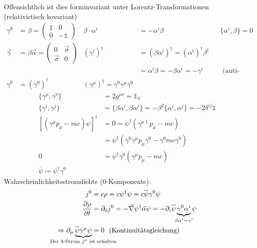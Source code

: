 Offensichtlich ist dies forminvariant unter Lorentz-Transformationen (relativistisch kovariant)
	\begin{align*}
		\gamma^0 &= \beta =
		\begin{pmatrix}
			\mathds{1} & 0 \\
			0 & -\mathds{1}
		\end{pmatrix}
		& \beta \cdot \alpha^i &= -\alpha^i \beta &
		&\{\alpha^i, \beta \} = 0 \\
		\vec{\gamma} &= \beta \vec{\alpha} =
		\begin{pmatrix}
			0 & \vec{\sigma} \\
			\vec{\sigma} & 0
		\end{pmatrix} &
		(\gamma^i)^\dagger &= (\beta \alpha^i)^\dagger
		= (\alpha^i)^\dagger \beta^\dagger \\
		& & &= \alpha^i \beta = -\beta \alpha^i = -\gamma^i
		& &\text{ (anti-hermitesch)} \\
		\gamma^0 &= (\gamma^0)^\dagger 
		& \boxed{(\gamma^\mu)^\dagger = \gamma^0 \gamma^\mu \gamma^0}&
	\end{align*}
	\begin{align*}
		\{\gamma^\mu, \gamma^\nu\} &= 2 g^{\mu \nu} = \mathds{1}_4\\
		\{\gamma^i, \gamma^j\} &=
		\{\beta \alpha^i, \beta \alpha^j\}
		= - \beta^2 \{\alpha^i, \alpha^j\} = -2 \delta^{ij} \mathds{1}\\
		\left[
			(\gamma^\mu p_\mu - m c) \psi
		\right]^\dagger &= 0 
		= \psi^\dagger (\gamma^{\mu \dagger} p_\mu - mc) \\
		&= \psi^\dagger \left(
			\gamma^0 \gamma^\mu p_\mu \gamma^0 - \gamma^0 mc \gamma^0
		\right) \\
		0 &= \psi^\dagger \gamma^0 (\gamma^\mu p_\mu - mc) \\
		\overline{\psi} \coloneqq \psi^\dagger \gamma^0
	\end{align*}
Wahrscheinlichkeitsstromdichte (0-Komponente):
	\begin{align*}
		j^0 &= c \rho = c \psi^\dagger \psi = c \overline{\psi} \gamma^0 \psi \\
		\frac{\partial \rho}{\partial t}
		&= \partial_0 j^0 = -\vec{\nabla} \psi^\dagger \vec{\alpha} \psi 
		= - \partial_i \overline{\psi}
		\underbrace{\gamma^0 \alpha^i}_{\mathclap{\beta \alpha^i = \gamma^i}} \psi \\
		\Rightarrow \partial_\mu 
		\underbrace{\overline{\psi} \gamma^\mu \psi}_{\mathclap{\text{Der 4-Strom }j^\mu \text{ ist erhalten}}} &= 0 ~~\text{(Kontinuitätsgleichung)}
	\end{align*}
